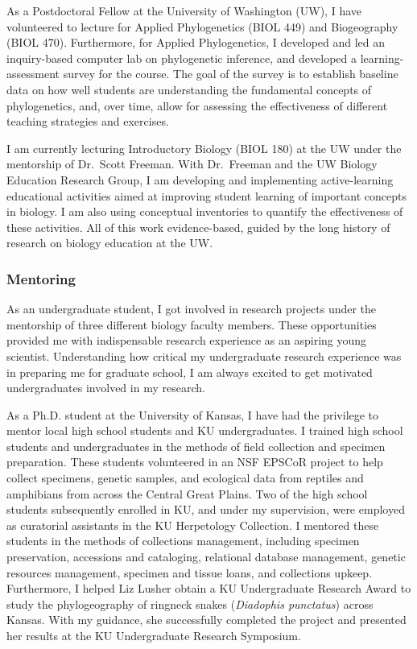 As a Postdoctoral Fellow at the University of Washington (UW), I have
volunteered to lecture for Applied Phylogenetics (BIOL 449) and Biogeography
(BIOL 470).
Furthermore, for Applied Phylogenetics, I developed and led an inquiry-based
computer lab on phylogenetic inference, and developed a learning-assessment
survey for the course.
The goal of the survey is to establish baseline data on how well students are
understanding the fundamental concepts of phylogenetics, and, over time, allow
for assessing the effectiveness of different teaching strategies and exercises.

I am currently lecturing Introductory Biology (BIOL 180) at the UW under the
mentorship of Dr.\ Scott Freeman.
With Dr.\ Freeman and the UW Biology Education Research Group, I am developing
and implementing active-learning educational activities aimed at improving
student learning of important concepts in biology.
I am also using conceptual inventories to quantify the effectiveness of these
activities.
All of this work evidence-based, guided by the long history of research on
biology education at the UW.

\subsubsection*{Mentoring}
As an undergraduate student, I got involved in research projects under the
mentorship of three different biology faculty members.
These opportunities provided me with indispensable research experience as an
aspiring young scientist.
Understanding how critical my undergraduate research experience was in
preparing me for graduate school, I am always excited to get motivated
undergraduates involved in my research.

As a Ph.D. student at the University of Kansas, I have had the privilege to
mentor local high school students and KU undergraduates.
I trained high school students and undergraduates in the methods of field
collection and specimen preparation.
These students volunteered in an NSF EPSCoR project to help collect specimens,
genetic samples, and ecological data from reptiles and amphibians from across
the Central Great Plains.
Two of the high school students subsequently enrolled in KU, and under my
supervision, were employed as curatorial assistants in the KU Herpetology
Collection.
I mentored these students in the methods of collections management, including
specimen preservation, accessions and cataloging, relational database
management, genetic resources management, specimen and tissue loans, and
collections upkeep.
Furthermore, I helped Liz Lusher obtain a KU Undergraduate Research Award to
study the phylogeography of ringneck snakes (\emph{Diadophis punctatus}) across
Kansas.
With my guidance, she successfully completed the project and presented her
results at the KU Undergraduate Research Symposium.

